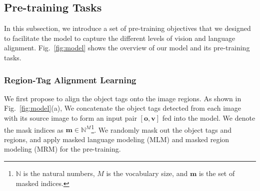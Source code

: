 \subsection{Pre-training Tasks}
In this subsection, we introduce a set of pre-training objectives that we designed to facilitate the model to capture the different levels of vision and language alignment.
Fig.~\ref{fig:model} shows the overview of our model and its pre-training tasks.


\subsubsection{Region-Tag Alignment Learning}
We first propose to align the object tags onto the image regions.
As shown in Fig.~\ref{fig:model}(a), We concatenate the object tags detected from each image with its source image to form an input pair $[\mathbf o, \mathbf v]$ fed into the model. 
We denote the mask indices as $\mathbf{m}\in \mathbb{N}^M$\footnote{$\mathbb{N}$ is the natural numbers, $M$ is the vocabulary size, and $\mathbf{m}$ is the set of masked indices.}. 
We randomly mask out the object tags and regions, and apply masked language modeling (MLM) and masked region modeling (MRM) for the pre-training.

